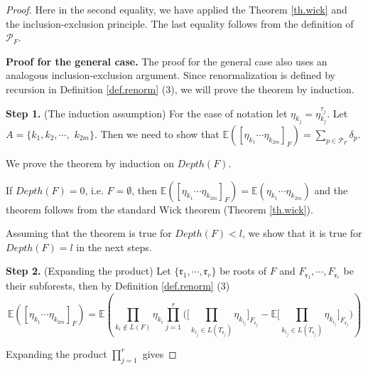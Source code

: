 \begin{proof}
 Here in the second equality, we have applied the Theorem \ref{th.wick} and the inclusion-exclusion principle. The last equality follows from the definition of $\mathcal{P}_F$.
 
 \textbf{Proof for the general case.} The proof for the general case also uses an analogous inclusion-exclusion argument. Since renormalization is defined by recursion in Definition \ref{def.renorm} (3), we will prove the theorem by induction. 
 
 \textbf{Step 1.} (The induction assumption) For the ease of notation let $\eta_{k_j}=\eta^{\tau_j}_{k_j}$. Let $A=\{k_1,k_2,\cdots,$ $k_{2m}\}$. Then we need to show that $\mathbb{E}([\eta_{k_1}\cdots \eta_{k_{2m}}]_F)=\sum_{p\in \mathcal{P}_F}\delta_p$.
 
 We prove the theorem by induction on $Depth(F)$.
 
 If $Depth(F)=0$, i.e. $F=\emptyset$, then $\mathbb{E}([\eta_{k_1}\cdots \eta_{k_{2m}}]_F)=\mathbb{E}(\eta_{k_1}\cdots \eta_{k_{2m}})$ and the theorem follows from the standard Wick theorem (Theorem \ref{th.wick}).
 
 Assuming that the theorem is true for $Depth(F)<l$, we show that it is true for $Depth(F)=l$ in the next steps.
 
 \textbf{Step 2.} (Expanding the product) Let $\{\mathfrak{r}_1,\cdots, \mathfrak{r}_r\}$ be roots of $F$ and $F_{\mathfrak{r}_1},\cdots,F_{\mathfrak{r}_r}$ be their subforests, then by Definition \ref{def.renorm} (3)
 \begin{equation}
  \mathbb{E}([\eta_{k_1}\cdots \eta_{k_{2m}}]_F)=\mathbb{E}\left(\prod_{k_i\notin L(F)} \eta_{k_i} \prod_{j=1}^r \Bigg(\Bigg[\prod_{k_{i_j}\in L(T_{\mathfrak{r}_j})}\eta_{k_{i_j}}\Bigg]_{F_{\mathfrak{r}_j}}-\mathbb{E}\Bigg[\prod_{k_{i_j}\in L(T_{\mathfrak{r}_j})}\eta_{k_{i_j}}\Bigg]_{F_{\mathfrak{r}_j}}\Bigg)\right)
 \end{equation}
 
 
 Expanding the product $\prod_{j=1}^r$ gives
 

\end{proof}
